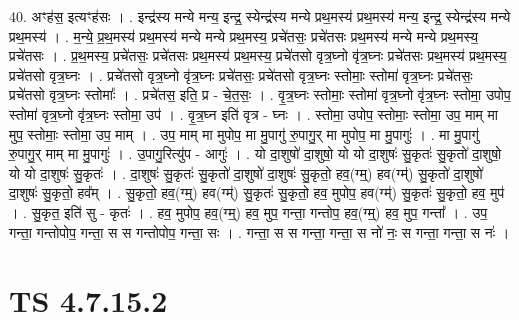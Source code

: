\documentclass[17pt]{extarticle}
\begin{document}
40. अꣳह॑स॒ इत्यꣳह॑सः । . इन्द्र॑स्य मन्ये मन्य॒ इन्द्र॒ स्येन्द्र॑स्य मन्ये प्रथ॒मस्य॑ प्रथ॒मस्य॑ मन्य॒ इन्द्र॒ स्येन्द्र॑स्य मन्ये प्रथ॒मस्य॑ । . म॒न्ये॒ प्र॒थ॒मस्य॑ प्रथ॒मस्य॑ मन्ये मन्ये प्रथ॒मस्य॒ प्रचे॑तसः॒ प्रचे॑तसः प्रथ॒मस्य॑ मन्ये मन्ये प्रथ॒मस्य॒ प्रचे॑तसः । . प्र॒थ॒मस्य॒ प्रचे॑तसः॒ प्रचे॑तसः प्रथ॒मस्य॑ प्रथ॒मस्य॒ प्रचे॑तसो वृत्र॒घ्नो वृ॑त्र॒घ्नः प्रचे॑तसः प्रथ॒मस्य॑ प्रथ॒मस्य॒ प्रचे॑तसो वृत्र॒घ्नः । . प्रचे॑तसो वृत्र॒घ्नो वृ॑त्र॒घ्नः प्रचे॑तसः॒ प्रचे॑तसो वृत्र॒घ्नः स्तोमाः॒ स्तोमा॑ वृत्र॒घ्नः प्रचे॑तसः॒ प्रचे॑तसो वृत्र॒घ्नः स्तोमाः᳚ । . प्रचे॑तस॒ इति॒ प्र - चे॒त॒सः॒ । . वृ॒त्र॒घ्नः स्तोमाः॒ स्तोमा॑ वृत्र॒घ्नो वृ॑त्र॒घ्नः स्तोमा॒ उपोप॒ स्तोमा॑ वृत्र॒घ्नो वृ॑त्र॒घ्नः स्तोमा॒ उप॑ । . वृ॒त्र॒घ्न इति॑ वृत्र - घ्नः । . स्तोमा॒ उपोप॒ स्तोमाः॒ स्तोमा॒ उप॒ माम् मा मुप॒ स्तोमाः॒ स्तोमा॒ उप॒ माम् । . उप॒ माम् मा मुपोप॒ मा मु॒पागु॑ रु॒पागु॒र् मा मुपोप॒ मा मु॒पागुः॑ । . मा मु॒पागु॑ रु॒पागु॒र् माम् मा मु॒पागुः॑ । . उ॒पागु॒रित्यु॑प - आगुः॑ । . यो दा॒शुषो॑ दा॒शुषो॒ यो यो दा॒शुषः॑ सु॒कृतः॑ सु॒कृतो॑ दा॒शुषो॒ यो यो दा॒शुषः॑ सु॒कृतः॑ । . दा॒शुषः॑ सु॒कृतः॑ सु॒कृतो॑ दा॒शुषो॑ दा॒शुषः॑ सु॒कृतो॒ हव॒(ग्म्॒) हव(ग्म्॑) सु॒कृतो॑ दा॒शुषो॑ दा॒शुषः॑ सु॒कृतो॒ हव᳚म् । . सु॒कृतो॒ हव॒(ग्म्॒) हव(ग्म्॑) सु॒कृतः॑ सु॒कृतो॒ हव॒ मुपोप॒ हव(ग्म्॑) सु॒कृतः॑ सु॒कृतो॒ हव॒ मुप॑ । . सु॒कृत॒ इति॑ सु - कृतः॑ । . हव॒ मुपोप॒ हव॒(ग्म्॒) हव॒ मुप॒ गन्ता॒ गन्तोप॒ हव॒(ग्म्॒) हव॒ मुप॒ गन्ता᳚ । . उप॒ गन्ता॒ गन्तोपोप॒ गन्ता॒ स स गन्तोपोप॒ गन्ता॒ सः । . गन्ता॒ स स गन्ता॒ गन्ता॒ स नो॑ नः॒ स गन्ता॒ गन्ता॒ स नः॑ । \newline
\pagebreak
{}

\section{ TS 4.7.15.2 }
\end{document}
